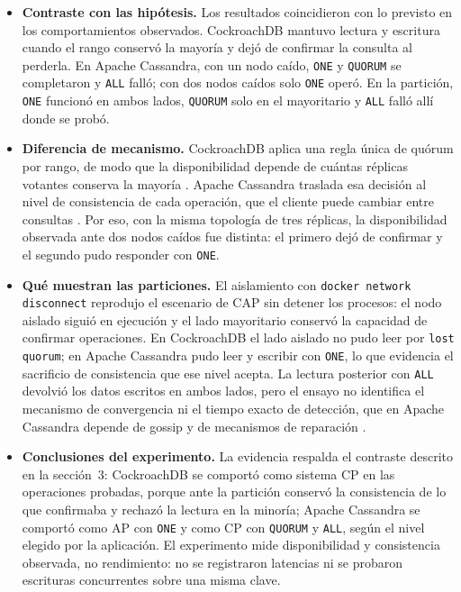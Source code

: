 \documentclass[11pt,a4paper]{article}
\newcommand{\sistemaA}{CockroachDB}      %
\newcommand{\sistemaB}{Apache Cassandra} %
\begin{document}
\begin{itemize}
  \item \textbf{Contraste con las hipótesis.} Los resultados coincidieron con lo
  previsto en los comportamientos observados. \sistemaA{} mantuvo lectura y escritura
  cuando el rango conservó la mayoría y dejó de confirmar la consulta al perderla. En
  \sistemaB{}, con un nodo caído, \texttt{ONE} y \texttt{QUORUM} se completaron y
  \texttt{ALL} falló; con dos nodos caídos solo \texttt{ONE} operó. En la partición,
  \texttt{ONE} funcionó en ambos lados, \texttt{QUORUM} solo en el mayoritario y
  \texttt{ALL} falló allí donde se probó.
  \item \textbf{Diferencia de mecanismo.} \sistemaA{} aplica una regla única de quórum
  por rango, de modo que la disponibilidad depende de cuántas réplicas votantes
  conserva la mayoría \cite{cockroachlabsReplication}. \sistemaB{} traslada esa
  decisión al nivel de consistencia de cada operación, que el cliente puede cambiar
  entre consultas \cite{apacheCassandraDynamo,apacheCassandraGuarantees}. Por eso,
  con la misma topología de tres réplicas, la disponibilidad observada ante dos nodos
  caídos fue distinta: el primero dejó de confirmar y el segundo pudo responder con
  \texttt{ONE}.
  \item \textbf{Qué muestran las particiones.} El aislamiento con
  \texttt{docker network disconnect} reprodujo el escenario de CAP sin detener los
  procesos: el nodo aislado siguió en ejecución y el lado mayoritario conservó la
  capacidad de confirmar operaciones. En \sistemaA{} el lado aislado no pudo leer por
  \texttt{lost quorum}; en \sistemaB{} pudo leer y escribir con \texttt{ONE}, lo que
  evidencia el sacrificio de consistencia que ese nivel acepta. La lectura posterior
  con \texttt{ALL} devolvió los datos escritos en ambos lados, pero el ensayo no
  identifica el mecanismo de convergencia ni el tiempo exacto de detección, que en
  \sistemaB{} depende de gossip y de mecanismos de reparación
  \cite{apacheCassandraArchitecture,apacheCassandraRepair}.
  \item \textbf{Conclusiones del experimento.} La evidencia respalda el contraste
  descrito en la sección~3: \sistemaA{} se comportó como sistema CP en las
  operaciones probadas, porque ante la partición conservó la consistencia de lo que
  confirmaba y rechazó la lectura en la minoría; \sistemaB{} se comportó como AP con
  \texttt{ONE} y como CP con \texttt{QUORUM} y \texttt{ALL}, según el nivel elegido
  por la aplicación. El experimento mide disponibilidad y consistencia observada, no
  rendimiento: no se registraron latencias ni se probaron escrituras concurrentes
  sobre una misma clave.
\end{itemize}
\end{document}
